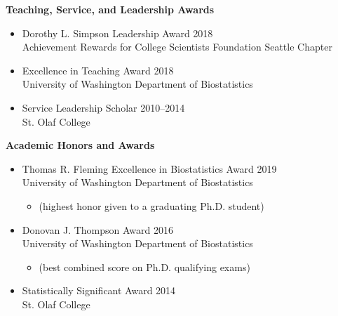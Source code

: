 \documentclass[margin]{res}
\begin{document}
\begin{resume}
\textbf{Teaching, Service, and Leadership Awards}
\begin{itemize}
\item Dorothy L. Simpson Leadership Award \hfill 2018 \\ Achievement Rewards for College Scientists Foundation Seattle Chapter 
\item Excellence in Teaching Award  \hfill 2018 \\
University of Washington Department of Biostatistics
\item Service Leadership Scholar \hfill 2010--2014 \\ St. Olaf College \\
\end{itemize}

\textbf{Academic Honors and Awards}
\begin{itemize} 
\item Thomas R. Fleming Excellence in Biostatistics Award \hfill 2019 \\   
University of Washington Department of Biostatistics
	\begin{itemize} \vspace{-0.2cm}
	\item[] 
	\begin{small}(highest honor given to a graduating Ph.D. student)\end{small}
	\end{itemize} \vspace{-0.1cm}
\item Donovan J. Thompson Award \hfill 2016 \\
University of Washington Department of Biostatistics 
	\begin{itemize} \vspace{-0.2cm}
	\item[] 
	\begin{small}(best combined score on Ph.D. qualifying exams) \end{small}
	\end{itemize} \vspace{-0.1cm}
\item Statistically Significant Award \hfill 2014 \\
St. Olaf College  

\end{itemize}
\end{resume}
\end{document}
